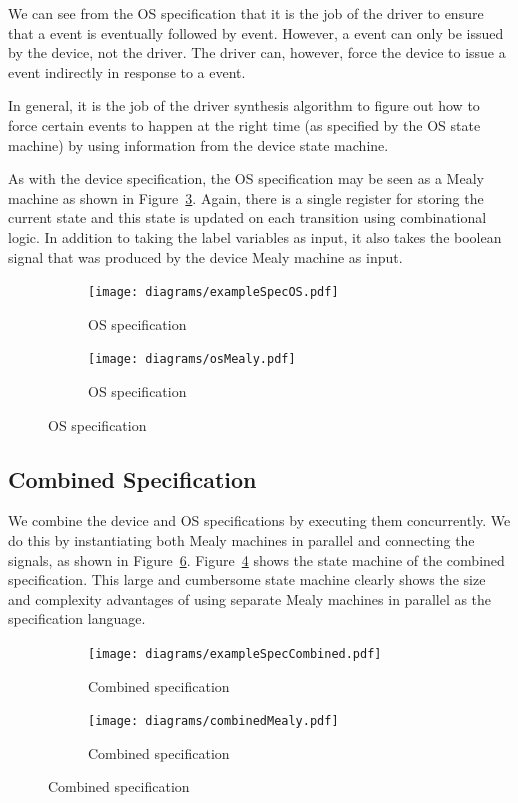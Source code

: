 We can see from the OS specification that it is the job of the driver to ensure that a  event is eventually followed by  event. However, a  event can only be issued by the device, not the driver. The driver can, however, force the device to issue a  event indirectly in response to a  event. 

In general, it is the job of the driver synthesis algorithm to figure out how to force certain events to happen at the right time (as specified by the OS state machine) by using information from the device state machine. 

As with the device specification, the OS specification may be seen as a Mealy machine as shown in Figure~\ref{fig:os_spec_mealy}. Again, there is a single register for storing the current state and this state is updated on each transition using combinational logic. In addition to taking the label variables as input, it also takes the  boolean signal that was produced by the device Mealy machine as input. 

\begin{figure}
\centering
\begin{subfigure}[t]{0.47\textwidth}
\texttt{[image: diagrams/exampleSpecOS.pdf]}
\caption{OS specification}
\label{fig:os_spec}
\end{subfigure}
\hfill
\begin{subfigure}[t]{0.47\textwidth}
\centering
\texttt{[image: diagrams/osMealy.pdf]}
\caption{OS specification}
\label{fig:os_spec_mealy}
\end{subfigure}
\end{figure}

\subsection{Combined Specification}

We combine the device and OS specifications by executing them concurrently. We do this by instantiating both Mealy machines in parallel and connecting the signals, as shown in Figure~\ref{fig:combined_spec_mealy}. Figure~\ref{fig:combined_spec} shows the state machine of the combined specification. This large and cumbersome state machine clearly shows the size and complexity advantages of using separate Mealy machines in parallel as the specification language.

\begin{figure}
\centering
\begin{subfigure}[t]{0.47\textwidth}
\texttt{[image: diagrams/exampleSpecCombined.pdf]}
\caption{Combined specification}
\label{fig:combined_spec}
\end{subfigure}
\hfill
\begin{subfigure}[t]{0.47\textwidth}
\texttt{[image: diagrams/combinedMealy.pdf]}
\caption{Combined specification}
\label{fig:combined_spec_mealy}
\end{subfigure}
\end{figure}

